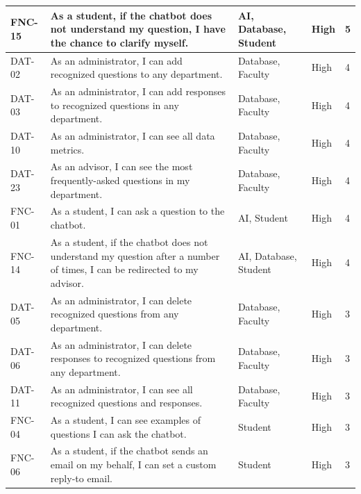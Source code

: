\documentclass[titlepage, 12pt]{article}
\begin{document}
\begin{center}
\begin{longtable}{ L{1.5cm} L{4cm} L{3cm} L{1.5cm} L{1.5cm} }
\midrule
FNC-15 & As a student, if the chatbot does not understand my question, I have the chance to clarify myself.                                & AI, Database, Student & High   & 5  \\
\midrule
DAT-02 & As an administrator, I can add recognized questions to any department.                                                            & Database, Faculty     & High   & 4  \\
\midrule
DAT-03 & As an administrator, I can add responses to recognized questions in any department.                                               & Database, Faculty     & High   & 4  \\
\midrule
DAT-10 & As an administrator, I can see all data metrics.                                                                                  & Database, Faculty     & High   & 4  \\
\midrule
DAT-23 & As an advisor, I can see the most frequently-asked questions in my department.                                                    & Database, Faculty     & High   & 4  \\
\midrule
FNC-01 & As a student, I can ask a question to the chatbot.                                                                                & AI, Student           & High   & 4  \\
\midrule
FNC-14 & As a student, if the chatbot does not understand my question after a number of times, I can be redirected to my advisor.          & AI, Database, Student & High   & 4  \\
\midrule
DAT-05 & As an administrator, I can delete recognized questions from any department.                                                       & Database, Faculty     & High   & 3  \\
\midrule
DAT-06 & As an administrator, I can delete responses to recognized questions from any department.                                          & Database, Faculty     & High   & 3  \\
\midrule
DAT-11 & As an administrator, I can see all recognized questions and responses.                                                            & Database, Faculty     & High   & 3  \\
\midrule
FNC-04 & As a student, I can see examples of questions I can ask the chatbot.                                                              & Student               & High   & 3  \\
\midrule
FNC-06 & As a student, if the chatbot sends an email on my behalf, I can set a custom reply-to email.                                      & Student               & High   & 3  \\

\end{longtable}
\end{center}
\end{document}
